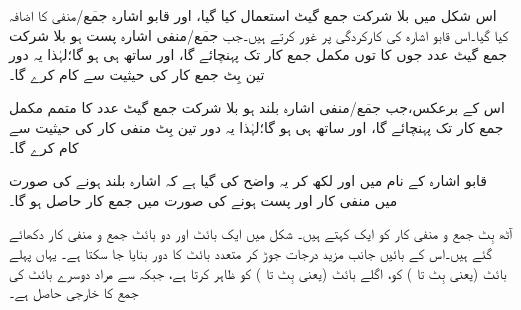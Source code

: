 اس شکل میں بلا شرکت جمع گیٹ استعمال کیا گیا، اور قابو اشارہ {{$\overline{\text{جمع}}$}/منفی} کا اضافہ کیا گیا۔اس قابو اشارہ کی کارکردگی پر غور کرتے ہیں۔جب {{$\overline{\text{جمع}}$}/منفی} اشارہ پست ہو بلا شرکت جمع گیٹ عدد  جوں کا توں مکمل جمع کار تک پہنچائے گا، اور ساتھ ہی ہو گا؛لہٰذا یہ دور تین بِٹ جمع کار کی حیثیت سے کام کرے گا۔

اس کے برعکس،جب {{$\overline{\text{جمع}}$}/منفی} اشارہ بلند ہو بلا شرکت جمع گیٹ عدد  کا متمم  مکمل جمع کار تک پہنچائے گا، اور ساتھ ہی ہو گا؛لہٰذا یہ دور تین بِٹ منفی کار کی حیثیت سے کام کرے گا۔
	
قابو اشارہ کے نام میں  اور  لکھ کر یہ واضح کی گیا ہے کہ اشارہ بلند ہونے کی صورت میں منفی کار اور پست ہونے کی صورت میں جمع کار حاصل ہو گا۔

	
آٹھ بِٹ جمع و منفی کار کو ایک کہتے ہیں۔ شکل  میں ایک بائٹ اور دو بائٹ جمع و منفی کار دکھائے گئے ہیں۔اس کے بائیں جانب مزید درجات جوڑ کر متعدد بائٹ کا دور بنایا جا سکتا ہے۔ یہاں  پہلے بائٹ (یعنی بِٹ  تا ) کو،  اگلے بائٹ (یعنی بِٹ  تا ) کو ظاہر کرتا ہے، جبکہ  سے مراد دوسرے بائٹ کی جمع کا خارجی حاصل ہے۔

